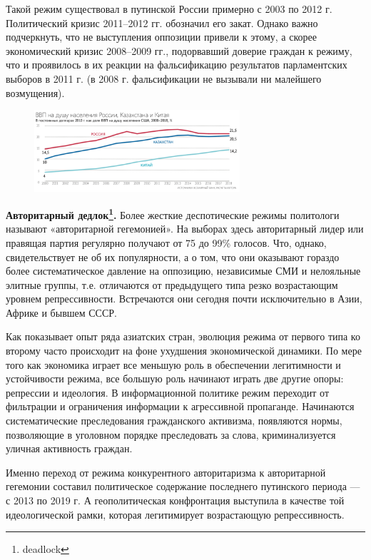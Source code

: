 Такой режим существовал в путинской России примерно с 2003 по 2012 г. Политический кризис 2011–2012 гг. обозначил его закат. Однако важно подчеркнуть, что не выступления оппозиции привели к этому, а скорее экономический кризис 2008–2009 гг., подорвавший доверие граждан к режиму, что и проявилось в их реакции на фальсификацию результатов парламентских выборов в 2011 г. (в 2008 г.  фальсификации не вызывали ни малейшего возмущения).

\begin{figure}
    \begin{center}
        \includegraphics[width=0.68\textwidth]{img/1tbz.png}
    \end{center}
\end{figure}
\textbf{Авторитарный дедлок\footnote{deadlock}.}
Более жесткие деспотические режимы политологи называют «авторитарной гегемонией». На выборах здесь авторитарный лидер или правящая партия регулярно получают от 75 до 99\% голосов. Что, однако, свидетельствует не об их популярности, а о том, что они оказывают гораздо более систематическое давление на оппозицию, независимые СМИ и нелояльные элитные группы, т.е. отличаются от предыдущего типа резко возрастающим уровнем репрессивности. Встречаются они сегодня почти исключительно в Азии, Африке и бывшем СССР.

Как показывает опыт ряда азиатских стран, эволюция режима от первого типа ко второму часто происходит на фоне ухудшения экономической динамики. По мере того как экономика играет все меньшую роль в обеспечении легитимности и устойчивости режима, все большую роль начинают играть две другие опоры: репрессии и идеология. В информационной политике режим переходит от фильтрации и ограничения информации к агрессивной пропаганде. Начинаются систематические преследования гражданского активизма, появляются нормы, позволяющие в уголовном порядке преследовать за слова, криминализуется уличная активность граждан.

Именно переход от режима конкурентного авторитаризма к авторитарной гегемонии составил политическое содержание последнего путинского периода --- с 2013 по 2019 г. А геополитическая конфронтация выступила в качестве той идеологической рамки, которая легитимирует возрастающую репрессивность.

